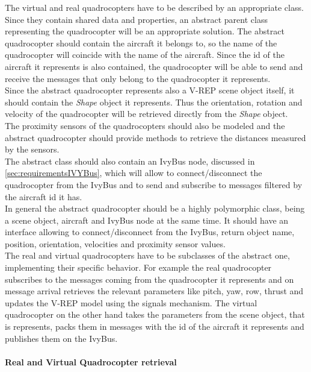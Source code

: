 The virtual and real quadrocopters have to be described by an appropriate class. \\
Since they contain shared data and properties, an abstract parent class representing the quadrocopter will be an appropriate solution. The abstract quadrocopter should contain the aircraft it belongs to, so the name of the quadrocopter will coincide with the name of the aircraft. Since the id of the aircraft it represents is also contained, the quadrocopter will be able to send and receive the messages that only belong to the quadrocopter it represents. \\
Since the abstract quadrocopter represents also a V-REP scene object itself, it should contain the \textit{Shape} object it represents. Thus the orientation, rotation and velocity of the quadrocopter will be retrieved directly from the \textit{Shape} object.\\
The proximity sensors of the quadrocopters should also be modeled and the abstract quadrocopter should provide methods to retrieve the distances measured by the sensors.\\
The abstract class should also contain an IvyBus node, discussed in \ref{sec:requirementsIVYBus}, which will allow to connect/disconnect the quadrocopter from the IvyBus and to send and subscribe to messages filtered by the aircraft id it has. \\
In general the abstract quadrocopter should be a highly polymorphic class, being a scene object, aircraft and IvyBus node at the same time. It should have an interface allowing to connect/disconnect from the IvyBus, return object name, position, orientation, velocities and proximity sensor values. \\
The real and virtual quadrocopters have to be subclasses of the abstract one, implementing their specific behavior. For example the real quadrocopter subscribes to the messages coming from the quadrocopter it represents and on message arrival retrieves the relevant parameters like pitch, yaw, row, thrust and updates the V-REP model using the signals mechanism. The virtual quadrocopter on the other hand takes the parameters from the scene object, that is represents, packs them in messages with the id of the aircraft it represents and publishes them on the IvyBus.

\paragraph{Real and Virtual Quadrocopter retrieval}

